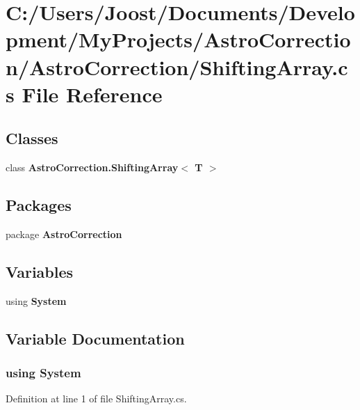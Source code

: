\section{C:/Users/Joost/Documents/Development/MyProjects/AstroCorrection/AstroCorrection/ShiftingArray.cs File Reference}
\label{_shifting_array_8cs}
\subsection*{Classes}
\begin{DoxyCompactItemize}
\item 
class {\bf AstroCorrection.ShiftingArray$<$ T $>$}
\end{DoxyCompactItemize}
\subsection*{Packages}
\begin{DoxyCompactItemize}
\item 
package {\bf AstroCorrection}
\end{DoxyCompactItemize}
\subsection*{Variables}
\begin{DoxyCompactItemize}
\item 
﻿using {\bf System}
\end{DoxyCompactItemize}


\subsection{Variable Documentation}
\subsubsection[{System}]{\setlength{\rightskip}{0pt plus 5cm}﻿using {\bf System}}\label{_shifting_array_8cs_a81a223a02c34d82b47199f08308847f2}


Definition at line 1 of file ShiftingArray.cs.